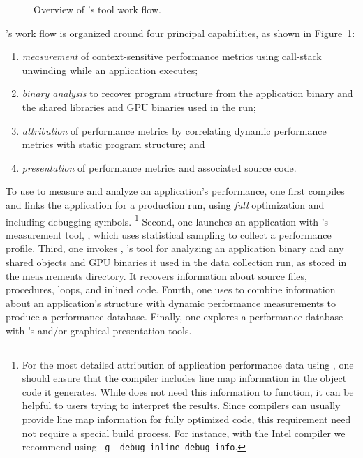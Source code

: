 \documentclass[11pt,twoside,letterpaper]{report}
\begin{document}
\begin{figure}[t]
\caption{Overview of \HPCToolkit{}'s tool work flow.}

\label{fig:hpctoolkit-overview:a}
\end{figure}

\HPCToolkit{}'s work flow is organized around four principal capabilities, as shown in Figure~\ref{fig:hpctoolkit-overview:a}:
\begin{enumerate}
  \item \emph{measurement} of context-sensitive performance metrics using call-stack unwinding
while an application executes;
  \item \emph{binary analysis} to recover program structure from the application binary and the shared libraries
and GPU binaries used in the run;
  \item \emph{attribution} of performance metrics by correlating dynamic performance metrics with static program structure; and
  \item \emph{presentation} of performance metrics and associated source code.
\end{enumerate}

To use \HPCToolkit{} to measure and analyze an application's performance, one first compiles and links the application for a production run, using \emph{full} optimization and including debugging symbols.%
\footnote{%
For the most detailed attribution of application performance data using \HPCToolkit{}, one should ensure that the compiler includes line map information in the object code it generates. While \HPCToolkit{} does not need this information to function, it can be helpful to users trying to interpret the results. Since compilers can usually provide line map information for fully optimized code, this requirement need not require a special build process. For instance, with the Intel compiler we recommend using \texttt{-g -debug inline\_debug\_info}.}
Second, one launches an application with \HPCToolkit{}'s measurement tool, \hpcrun{}, which uses statistical sampling to collect a performance profile.
Third, one invokes \hpcstruct{}, \HPCToolkit{}'s tool for analyzing an application binary and any shared objects and GPU binaries
it used in the data collection run, as stored in the measurements directory.  It recovers
information about source files, procedures, loops, and inlined code.
Fourth, one uses \hpcprof{} to combine information about an application's structure with dynamic performance measurements to produce a performance database.
Finally, one explores a performance database with \HPCToolkit{}'s \hpcviewer{} and/or \hpctraceviewer{} graphical presentation tools.
\end{document}
